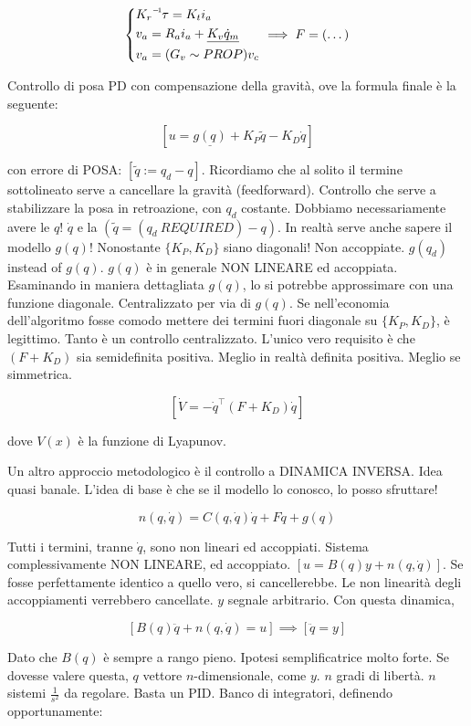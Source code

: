 \[
	\left\{
	\begin{aligned}
	&\inv{K_r}\tau = K_ti_a\\
	&v_a = R_ai_a + \underline{K_v\dot{q}_m}\\
	&v_a = (G_v\sim PROP)v_c
	\end{aligned}
	\right.\implies F=(\dots)
\]

Controllo di posa PD con compensazione della gravità, ove la formula finale è la seguente:

\[
	[u = \underline{g(q)} + K_P\tilde{q} - K_D\dot{q}]
\]

con errore di POSA: $[\tilde{q} := q_d-q]$. Ricordiamo che al solito il termine sottolineato serve a cancellare la gravità (feedforward). Controllo che serve a stabilizzare la posa in retroazione, con $q_d$ costante. Dobbiamo necessariamente avere le $q$! $\dot{q}$ e la $(\tilde{q} = (q_d\ REQUIRED)-q)$. In realtà serve anche sapere il modello $g(q)$! Nonostante $\{K_P,K_D\}$ siano diagonali! Non accoppiate. $g(q_d)$ instead of $g(q)$. $g(q)$ è in generale NON LINEARE ed accoppiata. Esaminando in maniera dettagliata $g(q)$, lo si potrebbe approssimare con una funzione diagonale. Centralizzato per via di $g(q)$. Se nell'economia dell'algoritmo fosse comodo mettere dei termini fuori diagonale su $\{K_P,K_D\}$, è legittimo. Tanto è un controllo centralizzato. L'unico vero requisito è che $(F+K_D)$ sia semidefinita positiva. Meglio in realtà definita positiva. Meglio se simmetrica.

\[
	[\dot{V} = -\dot{q}^\top(F+K_D)\dot{q}]
\]

dove $V(x)$ è la funzione di Lyapunov.

Un altro approccio metodologico è il controllo a DINAMICA INVERSA. Idea quasi banale. L'idea di base è che se il modello lo conosco, lo posso sfruttare!

\[
	n(q,\dot{q}) = C(q,\dot{q})\dot{q} + F\dot{q} + g(q)
\]

Tutti i termini, tranne $\dot{q}$, sono non lineari ed accoppiati. Sistema complessivamente NON LINEARE, ed accoppiato. $[u = B(q)y + n(q,\dot{q})]$. Se fosse perfettamente identico a quello vero, si cancellerebbe. Le non linearità degli accoppiamenti verrebbero cancellate. $y$ segnale arbitrario. Con questa dinamica,

\[
	[B(q)\ddot{q} + n(q,\dot{q}) = u] \implies [\ddot{q}=y] 
\]

Dato che $B(q)$ è sempre a rango pieno. Ipotesi semplificatrice molto forte. Se dovesse valere questa, $q$ vettore $n$-dimensionale, come $y$. $n$ gradi di libertà. $n$ sistemi $\frac{1}{s^2}$ da regolare. Basta un PID. Banco di integratori, definendo opportunamente: 

